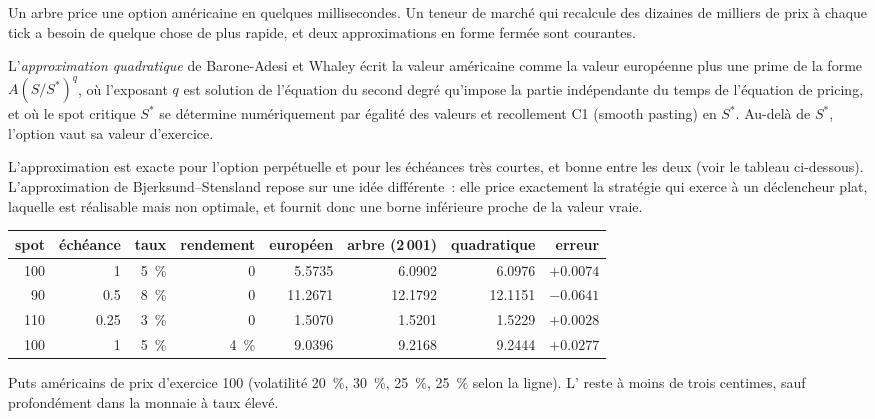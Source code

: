 Un arbre price une option américaine en quelques millisecondes. Un teneur de marché qui recalcule des
dizaines de milliers de prix à chaque tick a besoin de quelque chose de plus rapide, et deux
approximations en forme fermée sont courantes.

\begin{definition}\label{def:dv:american-options-and-early-exercise:baw}
L'\emph{approximation quadratique} de Barone-Adesi et Whaley
écrit la valeur américaine comme la valeur européenne plus une prime de la forme $A(S/S^*)^{q}$,
où l'exposant $q$ est solution de l'équation du second degré qu'impose la partie indépendante du temps de l'équation
de pricing, et où le spot critique $S^*$ se détermine numériquement par égalité des valeurs
et recollement C1 (smooth pasting) en $S^*$. Au-delà de $S^*$, l'option vaut sa valeur d'exercice.
\end{definition}

L'approximation est exacte pour l'option perpétuelle et pour les échéances très courtes, et bonne
entre les deux (voir le tableau ci-dessous). L'approximation de Bjerksund--Stensland repose sur une idée
différente~: elle price exactement la stratégie qui exerce à un déclencheur plat, laquelle est réalisable
mais non optimale, et fournit donc une borne inférieure proche de la valeur vraie.

\begin{center}
\footnotesize
\begin{tabular}{@{}rrrrrrrr@{}}
\toprule
spot & échéance & taux & rendement & européen & arbre (2\,001) & quadratique & erreur \\
\midrule
100 & 1 & 5~\% & 0 & 5.5735 & 6.0902 & 6.0976 & $+0.0074$ \\
90 & 0.5 & 8~\% & 0 & 11.2671 & 12.1792 & 12.1151 & $-0.0641$ \\
110 & 0.25 & 3~\% & 0 & 1.5070 & 1.5201 & 1.5229 & $+0.0028$ \\
100 & 1 & 5~\% & 4~\% & 9.0396 & 9.2168 & 9.2444 & $+0.0277$ \\
\bottomrule
\end{tabular}

\smallskip
Puts américains de prix d'exercice 100 (volatilité 20~\%, 30~\%, 25~\%, 25~\% selon la ligne). L' reste à moins de trois centimes, sauf profondément dans la monnaie à taux élevé.
\end{center}

